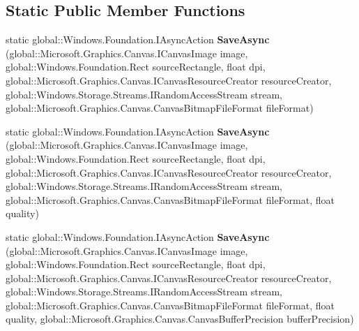 \subsection*{Static Public Member Functions}
\begin{DoxyCompactItemize}
\item 
\mbox{\label{class_microsoft_1_1_graphics_1_1_canvas_1_1_canvas_image_a30ada8b24e212bcbdc24f994e66ad191}} 
static global\+::\+Windows.\+Foundation.\+I\+Async\+Action {\bfseries Save\+Async} (global\+::\+Microsoft.\+Graphics.\+Canvas.\+I\+Canvas\+Image image, global\+::\+Windows.\+Foundation.\+Rect source\+Rectangle, float dpi, global\+::\+Microsoft.\+Graphics.\+Canvas.\+I\+Canvas\+Resource\+Creator resource\+Creator, global\+::\+Windows.\+Storage.\+Streams.\+I\+Random\+Access\+Stream stream, global\+::\+Microsoft.\+Graphics.\+Canvas.\+Canvas\+Bitmap\+File\+Format file\+Format)
\item 
\mbox{\label{class_microsoft_1_1_graphics_1_1_canvas_1_1_canvas_image_a84ddbc832a47bc0660a10d09a095ae1e}} 
static global\+::\+Windows.\+Foundation.\+I\+Async\+Action {\bfseries Save\+Async} (global\+::\+Microsoft.\+Graphics.\+Canvas.\+I\+Canvas\+Image image, global\+::\+Windows.\+Foundation.\+Rect source\+Rectangle, float dpi, global\+::\+Microsoft.\+Graphics.\+Canvas.\+I\+Canvas\+Resource\+Creator resource\+Creator, global\+::\+Windows.\+Storage.\+Streams.\+I\+Random\+Access\+Stream stream, global\+::\+Microsoft.\+Graphics.\+Canvas.\+Canvas\+Bitmap\+File\+Format file\+Format, float quality)
\item 
\mbox{\label{class_microsoft_1_1_graphics_1_1_canvas_1_1_canvas_image_a762e42f02f39504e92616098985cf683}} 
static global\+::\+Windows.\+Foundation.\+I\+Async\+Action {\bfseries Save\+Async} (global\+::\+Microsoft.\+Graphics.\+Canvas.\+I\+Canvas\+Image image, global\+::\+Windows.\+Foundation.\+Rect source\+Rectangle, float dpi, global\+::\+Microsoft.\+Graphics.\+Canvas.\+I\+Canvas\+Resource\+Creator resource\+Creator, global\+::\+Windows.\+Storage.\+Streams.\+I\+Random\+Access\+Stream stream, global\+::\+Microsoft.\+Graphics.\+Canvas.\+Canvas\+Bitmap\+File\+Format file\+Format, float quality, global\+::\+Microsoft.\+Graphics.\+Canvas.\+Canvas\+Buffer\+Precision buffer\+Precision)
\item 

\end{DoxyCompactItemize}
